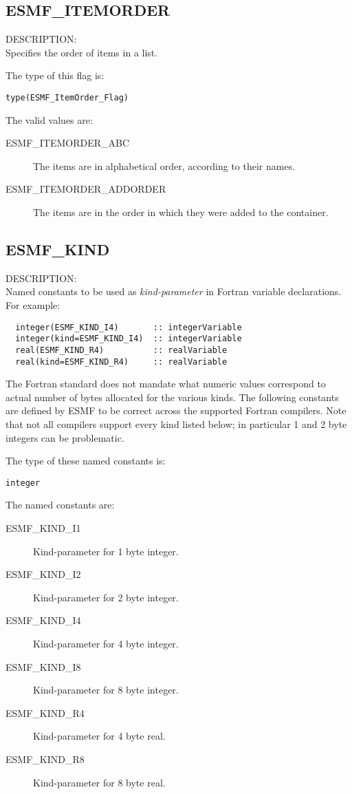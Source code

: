 \subsection{ESMF\_ITEMORDER}
\label{const:itemorderflag}
{\sf DESCRIPTION:\\}  
Specifies the order of items in a list.

The type of this flag is:

{\tt type(ESMF\_ItemOrder\_Flag)}

The valid values are:
\begin{description}

\item [ESMF\_ITEMORDER\_ABC]
         The items are in alphabetical order, according to their names.
\item [ESMF\_ITEMORDER\_ADDORDER]
         The items are in the order in which they were added to the container.
\end{description}


\subsection{ESMF\_KIND}
\label{const:kind}

{\sf DESCRIPTION:\\}
Named constants to be used as {\em kind-parameter} in Fortran variable
 declarations. For example:
\begin{verbatim}
  integer(ESMF_KIND_I4)       :: integerVariable
  integer(kind=ESMF_KIND_I4)  :: integerVariable
  real(ESMF_KIND_R4)          :: realVariable
  real(kind=ESMF_KIND_R4)     :: realVariable
\end{verbatim}
The Fortran standard does not mandate what numeric values correspond to
actual number of bytes allocated for the various kinds. The following constants
are defined by ESMF to be correct across the supported Fortran compilers.
Note that not all compilers support every kind listed below; in particular
1 and 2 byte integers can be problematic.

The type of these named constants is:

{\tt integer}

The named constants are:
\begin{description}
\item [ESMF\_KIND\_I1]
      Kind-parameter for 1 byte integer.
\item [ESMF\_KIND\_I2]
      Kind-parameter for 2 byte integer.
\item [ESMF\_KIND\_I4]
      Kind-parameter for 4 byte integer.
\item [ESMF\_KIND\_I8]
      Kind-parameter for 8 byte integer.
\item [ESMF\_KIND\_R4]
      Kind-parameter for 4 byte real.
\item [ESMF\_KIND\_R8]
      Kind-parameter for 8 byte real.
\end{description}


